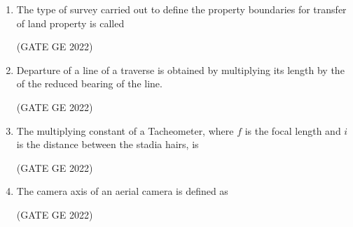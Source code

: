 \documentclass[journal,12pt,onecolumn]{IEEEtran}
\theoremstyle{remark}
\begin{document}
\begin{enumerate}
\item The type of survey carried out to define the property boundaries for transfer of land property is called

\hfill (GATE GE 2022)

\begin{enumerate}
\end{enumerate}



\item Departure of a line of a traverse is obtained by multiplying its length by the \makebox[1cm]{\hrulefill} of the reduced bearing of the line.

\hfill (GATE GE 2022)

\begin{enumerate}
\end{enumerate}

\item The multiplying constant of a Tacheometer, where $f$ is the focal length and $i$ is the distance between the stadia hairs, is

\hfill (GATE GE 2022)

\begin{enumerate}
\end{enumerate}

\item The camera axis of an aerial camera is defined as

\hfill (GATE GE 2022)


\end{enumerate}
\end{document}
